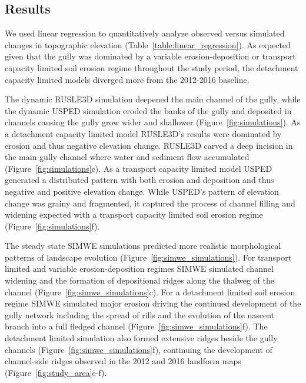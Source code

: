 \documentclass[gmd, manuscript]{copernicus}
\begin{document}
\subsection{Results}

We used linear regression to quantitatively analyze 
observed versus simulated changes in topographic elevation
(Table~\ref{table:linear_regression}).
As expected given that the gully was dominated 
by a variable erosion-deposition 
or  transport capacity limited soil erosion regime 
throughout the study period,
the detachment capacity limited models 
diverged more from the 2012-2016 baseline. 

The dynamic RUSLE3D simulation
deepened the main channel of the gully,
while the dynamic USPED simulation
eroded the banks of the gully
and deposited in channels
causing the gully grow wider and shallower
(Figure~\ref{fig:simulations}). 
%
As a detachment capacity limited model
RUSLE3D's results were
dominated by erosion and 
thus negative elevation change.
%
RUSLE3D carved a deep incision 
in the main gully channel
where water and sediment flow accumulated
(Figure~\ref{fig:simulations}c). 
%
As a transport capacity limited model
USPED generated a distributed pattern
with both erosion and deposition and thus
negative and positive elevation change. 
%
While USPED's pattern of elevation change
was grainy and fragmented, 
it captured the process of channel 
filling and widening expected with 
a transport capacity limited soil erosion regime
(Figure~\ref{fig:simulations}f). 

The steady state SIMWE simulations 
predicted more realistic morphological patterns 
of landscape evolution
(Figure~\ref{fig:simwe_simulations}). 
%
For transport limited and
variable erosion-deposition regimes
SIMWE simulated
channel widening 
and the formation of depositional ridges
along the thalweg of the channel
(Figure~\ref{fig:simwe_simulations}c).
%
For a detachment limited soil erosion regime
SIMWE simulated major erosion
driving the continued development 
of the gully network
including the spread of rills and
the evolution of the nascent branch
into a full fledged channel
(Figure~\ref{fig:simwe_simulations}f). 
%
The detachment limited simulation
also formed extensive ridges
beside the gully channels 
(Figure~\ref{fig:simwe_simulations}f), 
continuing the development of 
channel-side ridges
observed in the 2012 and 2016 landform maps
(Figure~\ref{fig:study_area}e-f). 
\end{document}
